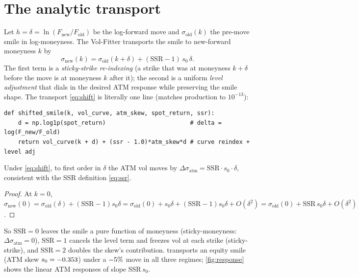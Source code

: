 \documentclass[11pt]{article}
\begin{document}
\section{The analytic transport}
\label{sec:transport}

Let $h=\delta=\ln(F_{\text{new}}/F_{\text{old}})$ be the log-forward move and
$\sigma_{\text{old}}(k)$ the pre-move smile in log-moneyness. The Vol-Fitter
transports the smile to new-forward moneyness $k$ by
\begin{equation}
\boxed{\;\sigma_{\text{new}}(k)=\sigma_{\text{old}}(k+\delta)+(\mathrm{SSR}-1)\,s_0\,\delta.\;}
\label{eq:shift}
\end{equation}
The first term is a \emph{sticky-strike re-indexing} (a strike that was at
moneyness $k+\delta$ before the move is at moneyness $k$ after it); the second is a
uniform \emph{level adjustment} that dials in the desired ATM response while
preserving the smile shape. The transport \eqref{eq:shift} is literally one line
(matches production to $10^{-13}$):

\begin{lstlisting}[caption={The SSR smile transport \eqref{eq:shift} for any
regime (distilled from \texttt{dynamics/ssr.py}; production's last argument
is a \texttt{regime} accepting a named regime or a numeric SSR).},
label={lst:ssr}]
def shifted_smile(k, vol_curve, atm_skew, spot_return, ssr):
    d = np.log1p(spot_return)                        # delta = log(F_new/F_old)
    return vol_curve(k + d) + (ssr - 1.0)*atm_skew*d # curve reindex + level adj
\end{lstlisting}

\begin{proposition}
\label{prop:atm}
Under \eqref{eq:shift}, to first order in $\delta$ the ATM vol moves by
$\Delta\sigma_{\text{atm}}=\mathrm{SSR}\cdot s_0\cdot\delta$, consistent with the
SSR definition \eqref{eq:ssr}.
\end{proposition}

\begin{proof}
At $k=0$, $\sigma_{\text{new}}(0)=\sigma_{\text{old}}(\delta)+(\mathrm{SSR}-1)s_0\delta
=\sigma_{\text{old}}(0)+s_0\delta+(\mathrm{SSR}-1)s_0\delta+O(\delta^2)
=\sigma_{\text{old}}(0)+\mathrm{SSR}\,s_0\delta+O(\delta^2)$.
\end{proof}

So $\mathrm{SSR}=0$ leaves the smile a pure function of moneyness (sticky-moneyness:
$\Delta\sigma_{\text{atm}}=0$), $\mathrm{SSR}=1$ cancels the level term and freezes
vol at each strike (sticky-strike), and $\mathrm{SSR}=2$ doubles the skew's
contribution.  transports an equity smile (ATM skew
$s_0=-0.353$) under a $-5\%$ move in all three regimes;
\cref{fig:response} shows the linear ATM responses of slope $\mathrm{SSR}\,s_0$.
\end{document}
